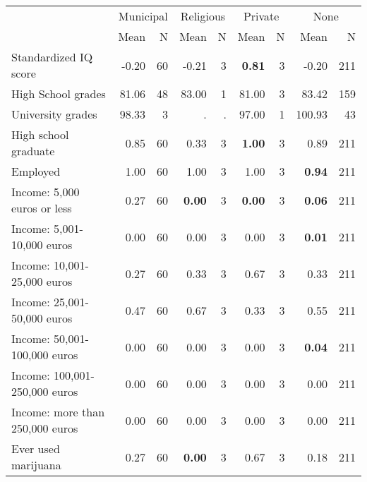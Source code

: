 \begin{tabular}{l r r r r r r r r}
\toprule
& \multicolumn{2}{c}{Municipal} & \multicolumn{2}{c}{Religious} & \multicolumn{2}{c}{Private} & \multicolumn{2}{c}{None} \\
& \scriptsize Mean & \scriptsize N & \scriptsize Mean & \scriptsize N & \scriptsize Mean & \scriptsize N & \scriptsize Mean & \scriptsize N \\
\midrule
Standardized IQ score &     -0.20 &        60 &     -0.21 &         3 & \textbf{     0.81} &         3 &     -0.20 &       211 \\
High School grades &     81.06 &        48 &     83.00 &         1 &     81.00 &         3 &     83.42 &       159 \\
University grades &     98.33 &         3 &         . & . &     97.00 &         1 &    100.93 &        43 \\
High school graduate &      0.85 &        60 &      0.33 &         3 & \textbf{     1.00} &         3 &      0.89 &       211 \\
Employed &      1.00 &        60 &      1.00 &         3 &      1.00 &         3 & \textbf{     0.94} &       211 \\
Income: 5,000 euros or less &      0.27 &        60 & \textbf{     0.00} &         3 & \textbf{     0.00} &         3 & \textbf{     0.06} &       211 \\
Income: 5,001-10,000 euros &      0.00 &        60 &      0.00 &         3 &      0.00 &         3 & \textbf{     0.01} &       211 \\
Income: 10,001-25,000 euros &      0.27 &        60 &      0.33 &         3 &      0.67 &         3 &      0.33 &       211 \\
Income: 25,001-50,000 euros &      0.47 &        60 &      0.67 &         3 &      0.33 &         3 &      0.55 &       211 \\
Income: 50,001-100,000 euros &      0.00 &        60 &      0.00 &         3 &      0.00 &         3 & \textbf{     0.04} &       211 \\
Income: 100,001-250,000 euros &      0.00 &        60 &      0.00 &         3 &      0.00 &         3 &      0.00 &       211 \\
Income: more than 250,000 euros &      0.00 &        60 &      0.00 &         3 &      0.00 &         3 &      0.00 &       211 \\
Ever used marijuana &      0.27 &        60 & \textbf{     0.00} &         3 &      0.67 &         3 &      0.18 &       211 \\

\end{tabular}
